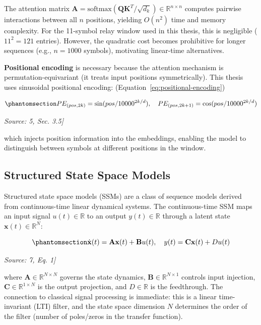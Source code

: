 The attention matrix \(\mathbf{A} = \text{softmax}(\mathbf{Q}\mathbf{K}^T / \sqrt{d_k}) \in \mathbb{R}^{n \times n}\) computes pairwise interactions between all \(n\) positions, yielding \(O(n^2)\) time and memory complexity. For the 11-symbol relay window used in this thesis, this is negligible (\(11^2 = 121\) entries). However, the quadratic cost becomes prohibitive for longer sequences (e.g., \(n = 1000\) symbols), motivating linear-time alternatives.

\textbf{Positional encoding} is necessary because the attention mechanism is permutation-equivariant (it treats input positions symmetrically). This thesis uses sinusoidal positional encoding: (Equation~\ref{eq:positional-encoding})

\begin{equation}\protect\phantomsection\label{eq:positional-encoding}{PE_{(pos, 2k)} = \sin(pos / 10000^{2k/d}), \quad PE_{(pos, 2k+1)} = \cos(pos / 10000^{2k/d})
}\end{equation} \par{\small\textit{Source: \cite{Laneman2004CooperativeDiversity}5, Sec. 3.5]}}

which injects position information into the embeddings, enabling the model to distinguish between symbols at different positions in the window.

\subsection{Structured State Space Models}\label{sec:structured-state-space-models}

Structured state space models (SSMs) \cite{GuGoelRe2022SSM} are a class of sequence models derived from continuous-time linear dynamical systems. The continuous-time SSM maps an input signal \(u(t) \in \mathbb{R}\) to an output \(y(t) \in \mathbb{R}\) through a latent state \(\mathbf{x}(t) \in \mathbb{R}^N\):

\begin{equation}\protect\phantomsection\label{eq:ssm-continuous}{\dot{\mathbf{x}}(t) = \mathbf{A}\mathbf{x}(t) + \mathbf{B}u(t), \quad y(t) = \mathbf{C}\mathbf{x}(t) + Du(t)
}\end{equation} \par{\small\textit{Source: \cite{Laneman2004CooperativeDiversity}7, Eq. 1]}}

where \(\mathbf{A} \in \mathbb{R}^{N \times N}\) governs the state dynamics, \(\mathbf{B} \in \mathbb{R}^{N \times 1}\) controls input injection, \(\mathbf{C} \in \mathbb{R}^{1 \times N}\) is the output projection, and \(D \in \mathbb{R}\) is the feedthrough. The connection to classical signal processing is immediate: this is a linear time-invariant (LTI) filter, and the state space dimension \(N\) determines the order of the filter (number of poles/zeros in the transfer function).

